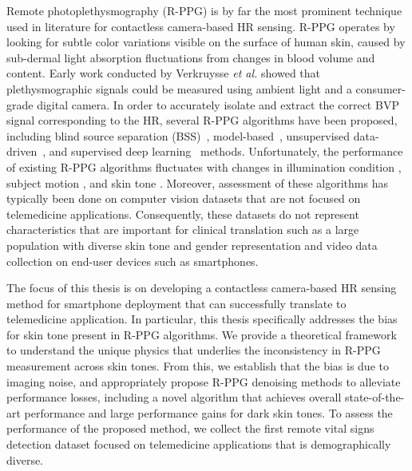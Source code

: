 Remote photoplethysmography (R-PPG) is by far the most prominent technique used in literature for contactless camera-based HR sensing. R-PPG operates by looking for subtle color variations visible on the surface of human skin, caused by sub-dermal light absorption fluctuations from changes in blood volume and content. Early work conducted by Verkruysse \textit{et al.} \cite{verkruysse_remote_2008} showed that plethysmographic signals could be measured using ambient light and a consumer-grade digital camera. In order to accurately isolate and extract the correct BVP signal corresponding to the HR, several R-PPG algorithms have been proposed, including blind source separation (BSS)~\cite{poh_noncontact_2010,tsouri_constrained_2012,lewandowska_measuring_2011}, model-based~\cite{haan_robust_2013,wang_algorithmic_2017,song_new_2020,de_haan_improved_2014}, unsupervised data-driven~\cite{wang_novel_2016,tulyakov_self-adaptive_2016}, and supervised deep learning~\cite{chen_deepphys_2018,niu_rhythmnet_2020,yu_remote_2019,yu_remote_2019-1,nowara_benefit_2020,spetlik_visual_2018} methods. Unfortunately, the performance of existing R-PPG algorithms fluctuates with changes in illumination condition \cite{li_remote_2014}, subject motion \cite{mocco_motion_2016,de_haan_improved_2014,wang_exploiting_2015}, and skin tone \cite{nowara_meta-analysis_2020}. Moreover, assessment of these algorithms has typically been done on computer vision datasets that are not focused on telemedicine applications. Consequently, these datasets do not represent characteristics that are important for clinical translation such as a large population with diverse skin tone and gender representation and video data collection on end-user devices such as smartphones. 

The focus of this thesis is on developing a contactless camera-based HR sensing method for smartphone deployment that can successfully translate to telemedicine application. In particular, this thesis specifically addresses the bias for skin tone present in R-PPG algorithms. We provide a theoretical framework to understand the unique physics that underlies the inconsistency in R-PPG measurement across skin tones. From this, we establish that the bias is due to imaging noise, and appropriately propose R-PPG denoising methods to alleviate performance losses, including a novel algorithm that achieves overall state-of-the-art performance and large performance gains for dark skin tones. To assess the performance of the proposed method, we collect the first remote vital signs detection dataset focused on telemedicine applications that is demographically diverse. 

